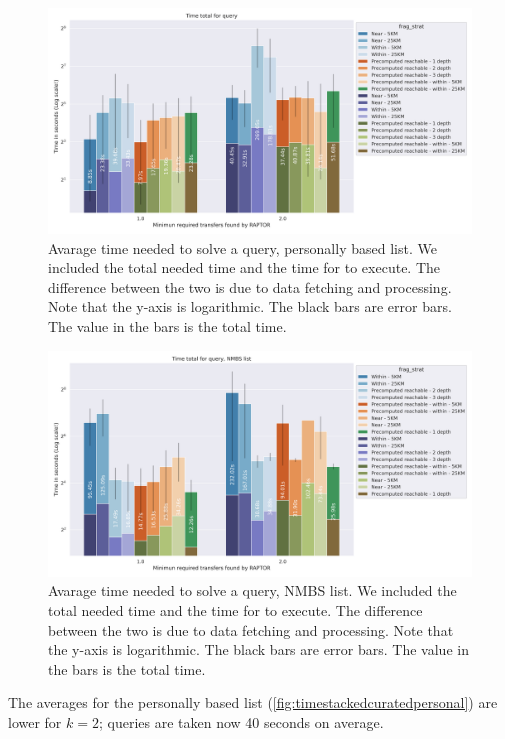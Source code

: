 \begin{figure}[H]
    \centering
    \includegraphics[width=\textwidth]{images/curated_personal_timestacked.png}
    \caption{Avarage time needed to solve a query, personally based list. We included the total needed time and the time for  to execute. The difference between the two is due to data fetching and processing. Note that the y-axis is logarithmic. The black bars are error bars. The value in the bars is the total time.}
    \label{fig:timestackedcuratedpersonal}
\end{figure}
\begin{figure}[H]
    \centering
    \includegraphics[width=\textwidth]{images/curated_nmbs_timestacked.png}
    \caption{Avarage time needed to solve a query, NMBS list. We included the total needed time and the time for  to execute. The difference between the two is due to data fetching and processing. Note that the y-axis is logarithmic. The black bars are error bars. The value in the bars is the total time.}
    \label{fig:curatednmbs}
\end{figure}
The averages for the personally based list (\autoref{fig:timestackedcuratedpersonal}) are lower for $k=2$; queries are taken now 40 seconds on average.

